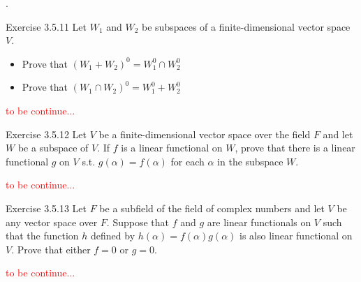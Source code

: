 \documentclass[8pt]{beamer}
\begin{document}
\begin{frame}{.}
    \begin{block}{Exercise 3.5.11}    
        Let $W_1$ and $W_2$ be subspaces of a finite-dimensional vector space $V$.
        \begin{itemize}
            \item Prove that $(W_1 + W_2)^0 = W_1^0 \cap W^0_2$
            \item Prove that $(W_1 \cap W_2)^0 = W_1^0 + W^0_2$
        \end{itemize}
        \textcolor{red}{to be continue...}
    \end{block}
    \begin{block}{Exercise 3.5.12}
        Let $V$ be a finite-dimensional vector space over the field $F$ and let $W$ be a subspace of $V$. If $f$ is a linear functional on $W$, prove that there is a linear functional $g$ on $V$ s.t. $g(\alpha) = f(\alpha)$ for each $\alpha$ in the subspace $W$.
    
        \textcolor{red}{to be continue...}
    \end{block}

    \begin{block}{Exercise 3.5.13}
        Let $F$ be a subfield of the field of complex numbers and let $V$ be any vector space over $F$.
        Suppose that $f$ and $g$ are linear functionals on $V$ such that the function $h$ defined by $h(\alpha) = f(\alpha) g(\alpha)$ is also linear functional on $V$.
        Prove that either $f=0$ or $g=0$.

        \textcolor{red}{to be continue...}
    \end{block}
\end{frame}
\end{document}
